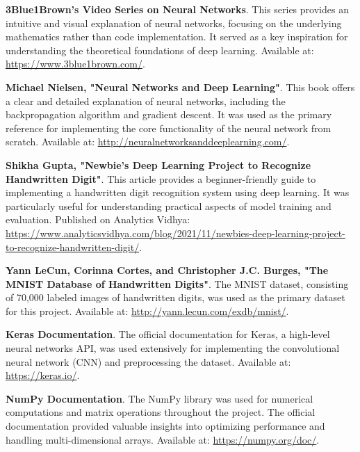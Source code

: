 \documentclass[conference]{IEEEtran}
\begin{document}
\begin{thebibliography}{00}

 \textbf{3Blue1Brown's Video Series on Neural Networks}. This series provides an intuitive and visual explanation of neural networks, focusing on the underlying mathematics rather than code implementation. It served as a key inspiration for understanding the theoretical foundations of deep learning. Available at: \url{https://www.3blue1brown.com/}.

 \textbf{Michael Nielsen, "Neural Networks and Deep Learning"}. This book offers a clear and detailed explanation of neural networks, including the backpropagation algorithm and gradient descent. It was used as the primary reference for implementing the core functionality of the neural network from scratch. Available at: \url{http://neuralnetworksanddeeplearning.com/}.

 \textbf{Shikha Gupta, "Newbie’s Deep Learning Project to Recognize Handwritten Digit"}. This article provides a beginner-friendly guide to implementing a handwritten digit recognition system using deep learning. It was particularly useful for understanding practical aspects of model training and evaluation. Published on Analytics Vidhya: \url{https://www.analyticsvidhya.com/blog/2021/11/newbies-deep-learning-project-to-recognize-handwritten-digit/}.

 \textbf{Yann LeCun, Corinna Cortes, and Christopher J.C. Burges, "The MNIST Database of Handwritten Digits"}. The MNIST dataset, consisting of 70,000 labeled images of handwritten digits, was used as the primary dataset for this project. Available at: \url{http://yann.lecun.com/exdb/mnist/}.

 \textbf{Keras Documentation}. The official documentation for Keras, a high-level neural networks API, was used extensively for implementing the convolutional neural network (CNN) and preprocessing the dataset. Available at: \url{https://keras.io/}.

 \textbf{NumPy Documentation}. The NumPy library was used for numerical computations and matrix operations throughout the project. The official documentation provided valuable insights into optimizing performance and handling multi-dimensional arrays. Available at: \url{https://numpy.org/doc/}.

\end{thebibliography}
\end{document}
